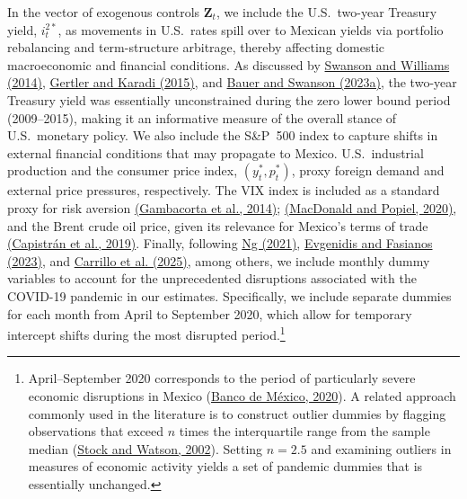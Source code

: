\documentclass[12pt, reqno]{article}
\begin{document}
In the vector of exogenous controls $\boldsymbol{Z}_t$, we include the U.S.\ two-year Treasury yield, $i_t^{2*}$, as movements in U.S.\ rates spill over to Mexican yields via portfolio rebalancing and term-structure arbitrage, thereby affecting domestic macroeconomic and financial conditions. As discussed by \hyperlink{Swanson and Williams (2014)}{Swanson and Williams (2014)}, \hyperlink{Gertler and Karadi (2015)}{Gertler and Karadi (2015)}, and \hyperlink{Bauer and Swanson (2023a)}{Bauer and Swanson (2023a)}, the two-year Treasury yield was essentially unconstrained during the zero lower bound period (2009--2015), making it an informative measure of the overall stance of U.S.\ monetary policy. We also include the S\&P~500 index to capture shifts in external financial conditions that may propagate to Mexico. U.S.\ industrial production and the consumer price index, $(y_t^*, p_t^*)$, proxy foreign demand and external price pressures, respectively. The VIX index is included as a standard proxy for risk aversion \hyperlink{Gambacorta et al. (2014)}{(Gambacorta et al., 2014)}; \hyperlink{MacDonald and Popiel (2020)}{(MacDonald and Popiel, 2020)}, and the Brent crude oil price, given its relevance for Mexico’s terms of trade \hyperlink{Capistrán et al. (2019)}{(Capistrán et al., 2019)}. Finally, following \hyperlink{Ng (2021)}{Ng (2021)}, \hyperlink{Evgenidis and Fasianos (2023)}{Evgenidis and Fasianos (2023)}, and \hyperlink{Carrillo et al. (2025)}{Carrillo et al. (2025)}, among others, we include monthly dummy variables to account for the unprecedented disruptions associated with the COVID-19 pandemic in our estimates. Specifically, we include separate dummies for each month from April to September 2020, which allow for temporary intercept shifts during the most disrupted period.\footnote{April--September 2020 corresponds to the period of particularly severe economic disruptions in Mexico (\hyperlink{Banco de Mexico (2020)}{Banco de México, 2020}). A related approach commonly used in the literature is to construct outlier dummies by flagging observations that exceed $n$ times the interquartile range from the sample median (\hyperlink{Stock and Watson (2002)}{Stock and Watson, 2002}). Setting $n=2.5$ and examining outliers in measures of economic activity yields a set of pandemic dummies that is essentially unchanged.} 
\end{document}
